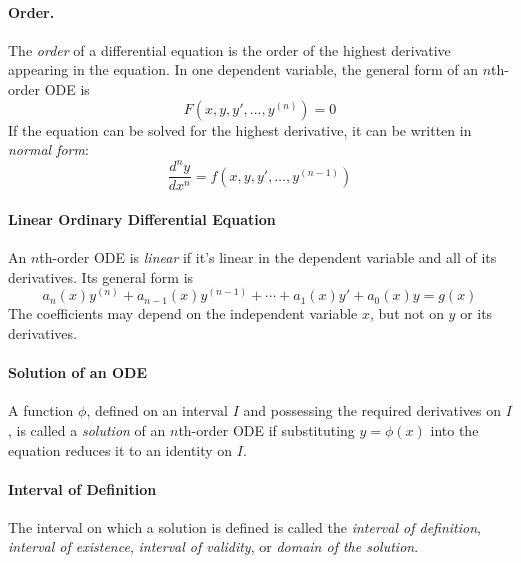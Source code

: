 \documentclass[oneside]{book}
\begin{document}

\paragraph{Order.}
The \emph{order} of a differential equation is the order of the highest derivative
appearing in the equation. In one dependent variable, the general form of an
$n$th-order ODE is
\[
    F(x,y,y',\ldots,y^{(n)})=0
\]
If the equation can be solved for the highest derivative, it can be written in
\emph{normal form}:
\[
    \frac{d^n y}{dx^n} = f(x,y,y',\ldots,y^{(n-1)})
\]

\paragraph{Linear Ordinary Differential Equation}{
    An $n$th-order ODE is \emph{linear} if it's linear in the dependent
    variable and all of its derivatives. Its general form is
    \[
        a_n(x)y^{(n)}
        +a_{n-1}(x)y^{(n-1)}
        +\cdots
        +a_1(x)y'
        +a_0(x)y
        =
        g(x)
    \]
    The coefficients may depend on the independent variable $x$, but not on
    $y$ or its derivatives.
}


\paragraph{Solution of an ODE}{
    A function $\phi$, defined on an interval $I$ and possessing the required
    derivatives on $I$, is called a \emph{solution} of an $n$th-order ODE if
    substituting $y=\phi(x)$ into the equation reduces it to an identity on $I$.
}

\paragraph{Interval of Definition}{
    The interval on which a solution is defined is called the \emph{interval of
    definition}, \emph{interval of existence}, \emph{interval of validity}, or
    \emph{domain of the solution}.
}
\end{document}
